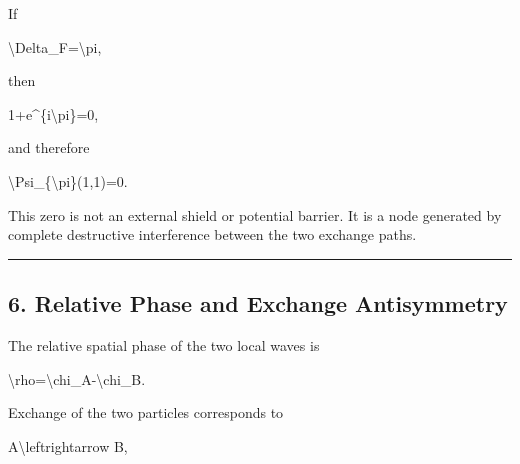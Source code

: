 \documentclass[
  a4paper,
]{article}
\newenvironment{Shaded}{}{}
\newcommand{\NormalTok}[1]{#1}
\begin{document}
If

\begin{Shaded}
\begin{Highlighting}[]
\NormalTok{\textbackslash{}Delta\_F=\textbackslash{}pi,}
\end{Highlighting}
\end{Shaded}

then

\begin{Shaded}
\begin{Highlighting}[]
\NormalTok{1+e\^{}\{i\textbackslash{}pi\}=0,}
\end{Highlighting}
\end{Shaded}

and therefore

\begin{Shaded}
\begin{Highlighting}[]
\NormalTok{\textbackslash{}Psi\_\{\textbackslash{}pi\}(1,1)=0.}
\end{Highlighting}
\end{Shaded}

This zero is not an external shield or potential barrier. It is a node
generated by complete destructive interference between the two exchange
paths.

\begin{center}\rule{0.5\linewidth}{0.5pt}\end{center}

\subsection{6. Relative Phase and Exchange
Antisymmetry}\label{relative-phase-and-exchange-antisymmetry}

The relative spatial phase of the two local waves is

\begin{Shaded}
\begin{Highlighting}[]
\NormalTok{\textbackslash{}rho=\textbackslash{}chi\_A{-}\textbackslash{}chi\_B.}
\end{Highlighting}
\end{Shaded}

Exchange of the two particles corresponds to

\begin{Shaded}
\begin{Highlighting}[]
\NormalTok{A\textbackslash{}leftrightarrow B,}
\end{Highlighting}
\end{Shaded}
\end{document}
